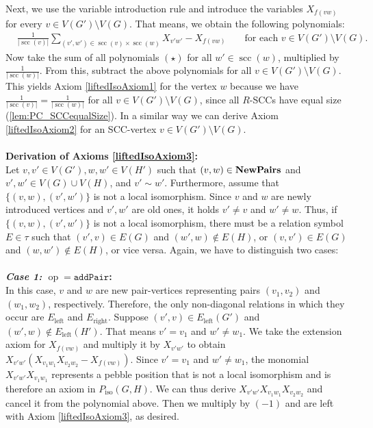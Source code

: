\documentclass[10pt,a4paper]{article}
\newcommand{\Pairs}{\text{\upshape \textbf{NewPairs}}}
\newcommand{\pairOp }{\texttt{addPair}}
\newcommand{\op}{\operatorname{op}}
\newcommand{\scc}{{\operatorname{scc}}}
\newcommand{\Piso}{P_{\text{iso}}}
\begin{document}
	Next, we use the variable introduction rule and introduce the variables $X_{f(vw)}$ for every $v \in V(G') \setminus V(G)$. That means, we obtain the following polynomials:
	\begin{align*}
		&\frac{1}{|\scc(v)|}\sum\limits_{(v',w')\in \scc(v) \times \scc(w)} X_{v' w'} - X_{f(vw)} & &\text{ for each } v \in V(G') \setminus V(G).
	\end{align*}
	Now take the sum of all polynomials $(\star)$ for all $w' \in \scc(w)$, multiplied by $\frac{1}{|\scc(w)|}$. From this, subtract the above polynomials for all $v \in V(G') \setminus V(G)$. This yields Axiom \eqref{liftedIsoAxiom1} for the vertex $w$ because we have $\frac{1}{|\scc(v)|} = \frac{1}{|\scc(w)|}$ for all $v \in V(G') \setminus V(G)$, since all $R$-SCCs have equal size (\autoref{lem:PC_SCCequalSize}).
	In a similar way we can derive Axiom \eqref{liftedIsoAxiom2} for an SCC-vertex $v \in V(G') \setminus V(G)$.\\
	\\
\textbf{Derivation of Axioms \eqref{liftedIsoAxiom3}:}\\
Let $v,v' \in V(G'), w,w' \in V(H')$ such that $(v,w) \in \Pairs$ and $v',w' \in V(G) \cup V(H)$, and $v' \sim w'$. Furthermore, assume that $\{(v,w),(v',w')\}$ is not a local isomorphism. Since $v$ and $w$ are newly introduced vertices and $v',w'$ are old ones, it holds $v' \neq v$ and $w' \neq w$. Thus, if $\{(v,w),(v',w')\}$ is not a local isomorphism, there must be a relation symbol $E \in \tau$ such that $(v',v) \in E(G)$ and $(w',w) \notin E(H)$, or $(v,v') \in E(G)$ and $(w,w') \notin E(H)$, or vice versa. Again, we have to distinguish two cases:\\
\\
\textbf{\textit{Case 1:} $\op = \pairOp $:}\\
In this case, $v$ and $w$ are new pair-vertices representing pairs $(v_1,v_2)$ and $(w_1,w_2)$, respectively. Therefore, the only non-diagonal relations in which they occur are $E_{\text{left}}$ and $E_{\text{right}}$. Suppose $(v',v) \in E_{\text{left}}(G')$ and $(w',w) \notin E_{\text{left}}(H')$. That means $v' = v_1$ and $w' \neq w_1$. 
We take the extension axiom for $X_{f(vw)}$ and multiply it by $X_{v'w'}$ to obtain $X_{v'w'}(X_{v_1w_1} X_{v_2w_2} - X_{f(vw)})$.
Since $v' = v_1$ and $w' \neq w_1$, the monomial $X_{v'w'}X_{v_1w_1}$ represents a pebble position that is not a local isomorphism and is therefore an axiom in $\Piso(G,H)$. We can thus derive $X_{v'w'}X_{v_1w_1} X_{v_2w_2}$ and cancel it from the polynomial above. Then we multiply by $(-1)$ and are left with Axiom \eqref{liftedIsoAxiom3}, as desired.
\end{document}
